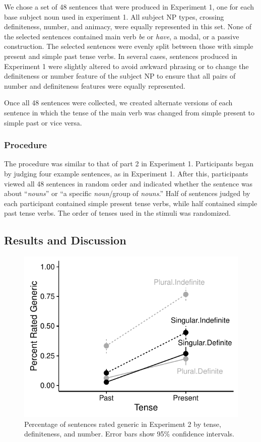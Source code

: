 \documentclass[10pt,letterpaper]{article}
\begin{document}
We chose a set of 48 sentences that were produced in Experiment 1, one for each base subject noun used in experiment 1. All subject NP types, crossing definiteness, number, and animacy, were equally represented in this set. None of the selected sentences contained main verb \textit{be} or \textit{have}, a modal, or a passive construction. The selected sentences were evenly split between those with simple present and simple past tense verbs. In several cases, sentences produced in Experiment 1 were slightly altered to avoid awkward phrasing or to change the definiteness or number feature of the subject NP to ensure that all pairs of number and definiteness features were equally represented. 

Once all 48 sentences were collected, we created alternate versions of each sentence in which the tense of the main verb was changed from simple present to simple past or vice versa.  

\subsubsection{Procedure} 

The procedure was similar to that of part 2 in Experiment 1. Participants began by judging four example sentences, as in Experiment 1. After this, participants viewed all 48 sentences in random order and indicated whether the sentence was about ``\textit{nouns}'' or ``a specific \textit{noun}/group of \textit{nouns}.'' Half of sentences judged by each participant contained simple present tense verbs, while half contained simple past tense verbs. The order of tenses used in the stimuli was randomized.  

\subsection{Results and Discussion}

\begin{figure}[t]
\centering
\includegraphics[width=.8\linewidth]{figures/tense.pdf}
\caption{\label{fig:tense} Percentage of sentences rated generic in Experiment 2 by tense, definiteness, and number. Error bars show 95\% confidence intervals.} 
\end{figure}
\end{document}
